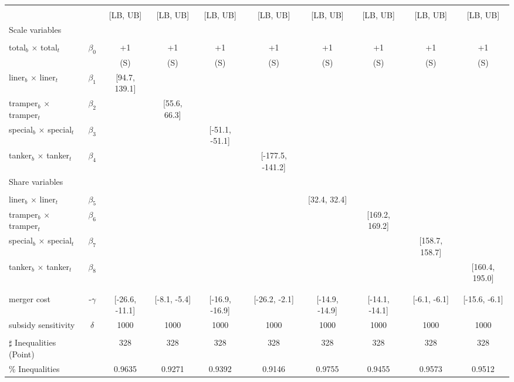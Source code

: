 \begin{tabular}{@{\extracolsep{5pt}}lccccccccc}
\toprule 
 &  &  &  &  &  &  &  &  &  \\
 &  & [LB, UB] & [LB, UB] & [LB, UB] & [LB, UB] & [LB, UB] & [LB, UB] & [LB, UB] & [LB, UB] \\
\midrule 
Scale variables &  &  &  &  &  &  &  \\
 &  &  &  &  &  &  &  &  \\
total$_{b}$ $\times$ total$_{t}$ & $\beta_0$ & +1 & +1 & +1 & +1 & +1 & +1 & +1 & +1 \\
 &  & (S) & (S) & (S) & (S) & (S) & (S) & (S) & (S) \\
liner$_{b}$ $\times$ liner$_{t}$ & $\beta_1$ & [94.7, 139.1] &  &  &  &  &  &  &  \\
tramper$_{b}$ $\times$ tramper$_{t}$ & $\beta_2$ &  & [55.6, 66.3] &  &  &  &  &  &  \\
special$_{b}$ $\times$ special$_{t}$ & $\beta_3$ &  &  & [-51.1, -51.1] &  &  &  &  &  \\
tanker$_{b}$ $\times$ tanker$_{t}$ & $\beta_4$ &  &  &  & [-177.5, -141.2] &  &  &  &  \\
Share variables &  &  &  &  &  &  &  &  &  \\
 &  &  &  &  &  &  &  &  &  \\
liner$_{b}$ $\times$ liner$_{t}$ & $\beta_5$ &  &  &  &  & [32.4, 32.4] &  &  &  \\
tramper$_{b}$ $\times$ tramper$_{t}$ & $\beta_6$ &  &  &  &  &  & [169.2, 169.2] &  &  \\
special$_{b}$ $\times$ special$_{t}$ & $\beta_7$ &  &  &  &  &  &  & [158.7, 158.7] &  \\
tanker$_{b}$ $\times$ tanker$_{t}$ & $\beta_8$ &  &  &  &  &  &  &  & [160.4, 195.0] \\
 &  &  &  &  &  &  &  &  &  \\
 &  &  &  &  &  &  &  &  &  \\
merger cost & -$\gamma$ & [-26.6, -11.1] & [-8.1, -5.4] & [-16.9, -16.9] & [-26.2, -2.1] & [-14.9, -14.9] & [-14.1, -14.1] & [-6.1, -6.1] & [-15.6, -6.1] \\
subsidy sensitivity & $\delta$ & 1000 & 1000 & 1000 & 1000 & 1000 & 1000 & 1000 & 1000 \\
 &  &  &  &  &  &  &  &  &  \\
\hline 
$\sharp$ Inequalities (Point) &  & 328 & 328 & 328 & 328 & 328 & 328 & 328 & 328 \\
\% Inequalities &  & 0.9635 & 0.9271 & 0.9392 & 0.9146 & 0.9755 & 0.9455 & 0.9573 & 0.9512 \\
\bottomrule 
\end{tabular}
